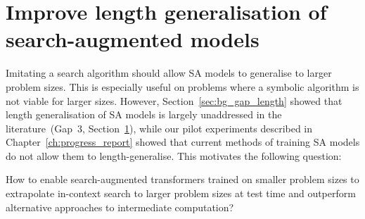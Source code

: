 \section{Improve length generalisation of search-augmented models}
\label{sec:proposal_rq3}

Imitating a search algorithm should allow SA models to generalise to larger problem sizes.
This is especially useful on problems where a symbolic algorithm is not viable for larger sizes.
However, Section~\ref{sec:bg_gap_length} showed that length generalisation of SA models is largely unaddressed in the literature~(Gap~3, Section~\ref{sec:proposal_rq3}), while our pilot experiments described in Chapter~\ref{ch:progress_report} showed that current methods of training SA models do not allow them to length-generalise.
This motivates the following question:

\begin{tcolorbox}[title=Research Question 3, colback=ThesisBlue!5, colframe=ThesisBlue, fonttitle=\bfseries, fontupper=\itshape]
How to enable search-augmented transformers trained on smaller problem sizes to extrapolate in-context search to larger problem sizes at test time and outperform alternative approaches to intermediate computation?
\end{tcolorbox}

